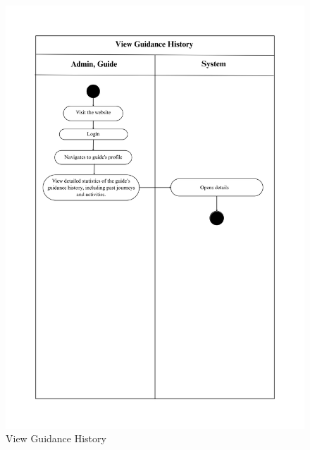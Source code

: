\begin{figure}[h!]
    \centering
    \includegraphics[width=1\textwidth]{Images/Activity Diagrams/18 View Guidance History.png}
    \caption{View Guidance History}
    \label{fig:activity-guide-history}
\end{figure}

